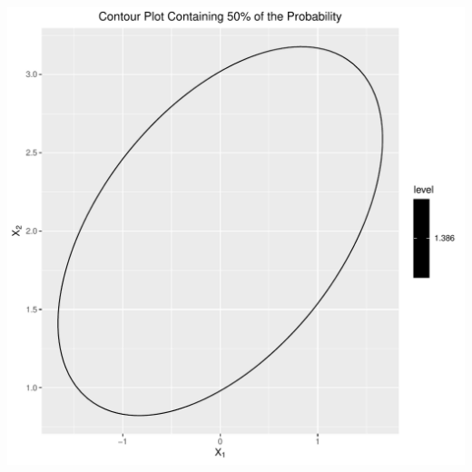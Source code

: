 \documentclass[12pt]{article}\usepackage[]{graphicx}\usepackage[]{color}
\makeatletter
\def\maxwidth{ %
  \ifdim\Gin@nat@width>\linewidth
    \linewidth
  \else
    \Gin@nat@width
  \fi
}
\newenvironment{knitrout}{}{} %
\newenvironment{problem}[2][Problem]{\begin{trivlist}
\item[\hskip \labelsep {\bfseries #1}\hskip \labelsep {\bfseries #2.}]}{\end{trivlist}}
\makeatother
\begin{document}
\begin{enumerate}[a)]
\begin{knitrout}
\color{fgcolor}
\includegraphics[width=\maxwidth]{figure/unnamed-chunk-2-1} 

\end{knitrout}
\end{enumerate}


\begin{problem}{4.3}
\end{problem}
\end{document}
